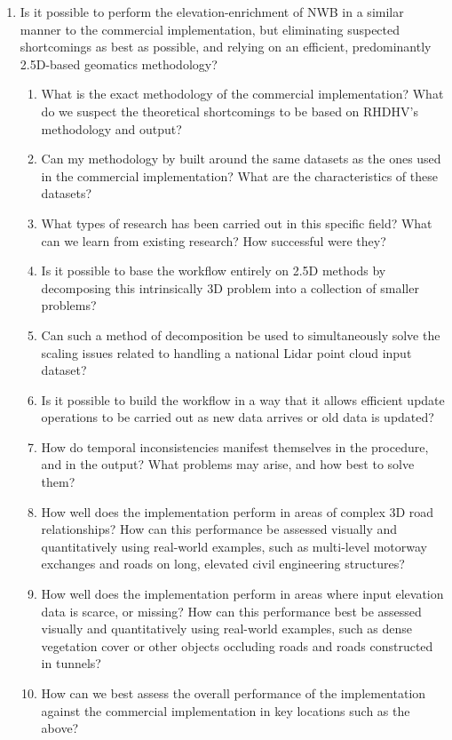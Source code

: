 \begin{enumerate}
    \item Is it possible to perform the elevation-enrichment of NWB in a similar manner to the commercial implementation, but eliminating suspected shortcomings as best as possible, and relying on an efficient, predominantly 2.5D-based geomatics methodology?
    \begin{enumerate}
        \item What is the exact methodology of the commercial implementation? What do we suspect the theoretical shortcomings to be based on RHDHV's methodology and output?
        \item Can my methodology by built around the same datasets as the ones used in the commercial implementation? What are the characteristics of these datasets?
        \item What types of research has been carried out in this specific field? What can we learn from existing research? How successful were they?
        \item Is it possible to base the workflow entirely on 2.5D methods by decomposing this intrinsically 3D problem into a collection of smaller problems?
        \item Can such a method of decomposition be used to simultaneously solve the scaling issues related to handling a national Lidar point cloud input dataset?
        \item Is it possible to build the workflow in a way that it allows efficient update operations to be carried out as new data arrives or old data is updated?
        \item How do temporal inconsistencies manifest themselves in the procedure, and in the output? What problems may arise, and how best to solve them?
        \item How well does the implementation perform in areas of complex 3D road relationships? How can this performance be assessed visually and quantitatively using real-world examples, such as multi-level motorway exchanges and roads on long, elevated civil engineering structures?
        \item How well does the implementation perform in areas where input elevation data is scarce, or missing? How can this performance best be assessed visually and quantitatively using real-world examples, such as dense vegetation cover or other objects occluding roads and roads constructed in tunnels?
        \item How can we best assess the overall performance of the implementation against the commercial implementation in key locations such as the above?

\end{enumerate}
\end{enumerate}
